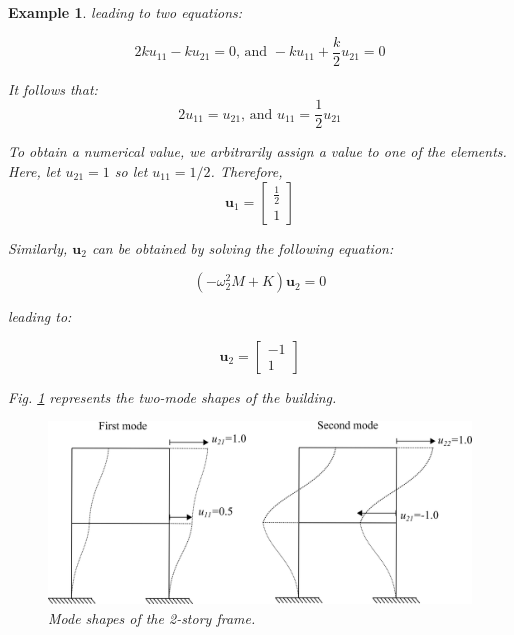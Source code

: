 \documentclass[12pt,letter]{article}
\newtheorem{ex}{Example}
\numberwithin{ex}{section} %
\newenvironment{example}{\begin{mdframed}[middlelinewidth=0.5mm]\begin{ex}\normalfont}{\end{ex}\end{mdframed}}
\numberwithin{re}{section} %
\begin{document}
\begin{example}
\noindent leading to two equations:

\begin{equation}
2 k u_{11} -k u_{21}=0 \text{, and } -k u_{11} + \frac{k}{2} u_{21}=0
\end{equation}

\noindent It follows that:
\begin{equation}
2 u_{11}= u_{21}  \text{, and } u_{11} = \frac{1}{2}u_{21}
\end{equation}

\noindent To obtain a numerical value, we arbitrarily assign a value to one of the elements. Here, let $u_{21}=1$ so let $u_{11}=1/2$. Therefore, 
\begin{equation}
\textbf{u}_1 = \begin{bmatrix} \frac{1}{2}\\ 1\end{bmatrix}
\end{equation}

\noindent Similarly, $\mathbf{u}_2$ can be obtained by solving the following equation:

\begin{equation}
(-\omega_2^2 M  + K)\mathbf{u}_2 =0
\end{equation}

\noindent leading to:

\begin{equation}
	\textbf{u}_2 = \begin{bmatrix} -1\\ 1\end{bmatrix}
\end{equation}

\noindent Fig. \ref{fig:modeshapes} represents the two-mode shapes of the building. 

\vspace{4ex}

\begin{figure}[H]
	\centering
	\includegraphics{../figures/two_story_frame_example_mode_shapes.png}
	\caption{Mode shapes of the 2-story frame.}
	\label{fig:modeshapes}
\end{figure}


\end{example}
\end{document}
